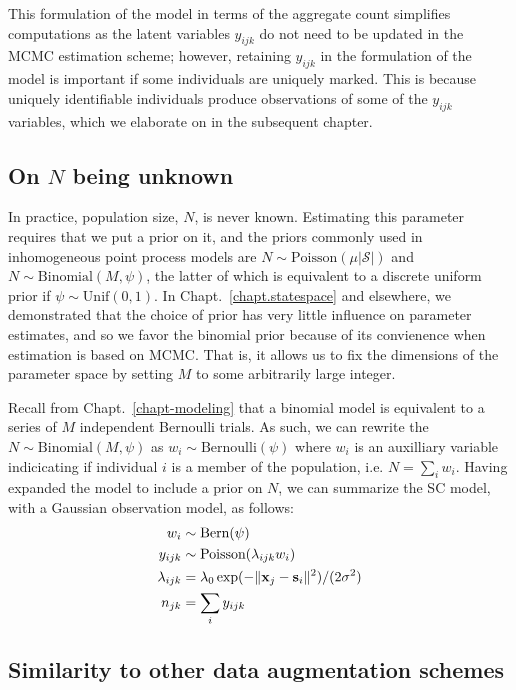This formulation of the model in terms of the aggregate count
simplifies computations as the latent variables
$y_{ijk}$ do not need to be updated in the MCMC estimation
scheme; however, retaining $y_{ijk}$ in the formulation of the model
is important if some individuals are uniquely marked. %
This is because
uniquely identifiable individuals produce
observations of some of the $y_{ijk}$ variables, which we elaborate
on in the subsequent chapter.

\subsection{On $N$ being unknown}

In practice, population size, $N$, is never known. Estimating this %
parameter requires that we put a prior on it, and the priors commonly
used in inhomogeneous point process models are
$N \sim \text{Poisson}(\mu|\mathcal{S}|)$ and
$N \sim \text{Binomial}(M, \psi)$, the latter of which is equivalent
to a discrete uniform prior if $\psi \sim \text{Unif}(0,1)$. In
Chapt.~\ref{chapt.statespace} and elsewhere, we demonstrated that
the choice of prior has very little influence on parameter estimates,
and so we favor the binomial prior because of its convienence when
estimation is based on MCMC. That is, it allows us to fix the
dimensions of the parameter space by setting $M$ to some arbitrarily
large integer.

Recall from Chapt.~\ref{chapt-modeling} that a binomial model is
equivalent to a series of $M$ independent Bernoulli trials. As such,
we can rewrite the $N \sim \text{Binomial}(M, \psi)$ as $w_i \sim
\text{Bernoulli}(\psi)$ where $w_i$ is an auxilliary variable
indicicating if individual $i$ is a member of the population, i.e. $N =
\sum_i w_i$. Having expanded the model to include a prior on $N$, we
can summarize the SC model, with a Gaussian observation model, as follows:
\begin{align*}
  w_i &\sim \text{Bern}(\psi) \\
  y_{ijk} &\sim \text{Poisson}(\lambda_{ijk} w_i) \\
  \lambda_{ijk} &= \lambda_0\exp(-\|{\bf x}_j - {\bf s}_i\|^2)/(2\sigma^2) \\
  n_{jk} &= \sum_i y_{ijk}
\end{align*}

\subsection{Similarity to other data augmentation schemes}

